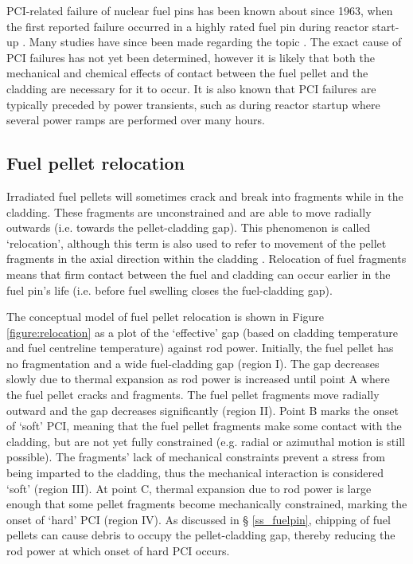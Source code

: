 PCI-related failure of nuclear fuel pins has been known about since 1963, when the first reported failure occurred in a highly rated fuel pin during reactor start-up \cite{lyons1963high}. Many studies have since been made regarding the topic \cite{alam2011review, bcoxpelletclad1990}. The exact cause of PCI failures has not yet been determined, however it is likely that both the mechanical and chemical effects of contact between the fuel pellet and the cladding are necessary for it to occur. It is also known that PCI failures are typically preceded by power transients, such as during reactor startup where several power ramps are performed over many hours.

\subsection{Fuel pellet relocation}

Irradiated fuel pellets will sometimes crack and break into fragments while in the cladding. These fragments are unconstrained and are able to move radially outwards (i.e. towards the pellet-cladding gap). This phenomenon is called `relocation', although this term is also used to refer to movement of the pellet fragments in the axial direction within the cladding \cite{sheppard1982data}. Relocation of fuel fragments means that firm contact between the fuel and cladding can occur earlier in the fuel pin's life (i.e. before fuel swelling closes the fuel-cladding gap).

The conceptual model of fuel pellet relocation is shown in Figure \ref{figure:relocation} as a plot of the `effective' gap (based on cladding temperature and fuel centreline temperature) against rod power. Initially, the fuel pellet has no fragmentation and a wide fuel-cladding gap (region I). The gap decreases slowly due to thermal expansion as rod power is increased until point A where the fuel pellet cracks and fragments. The fuel pellet fragments move radially outward and the gap decreases significantly (region II). Point B marks the onset of `soft' PCI, meaning that the fuel pellet fragments make some contact with the cladding, but are not yet fully constrained (e.g. radial or azimuthal motion is still possible). The fragments' lack of mechanical constraints prevent a stress from being imparted to the cladding, thus the mechanical interaction is considered `soft' (region III). At point C, thermal expansion due to rod power is large enough that some pellet fragments become mechanically constrained, marking the onset of `hard' PCI (region IV). As discussed in § \ref{ss_fuelpin}, chipping of fuel pellets can cause debris to occupy the pellet-cladding gap, thereby reducing the rod power at which onset of hard PCI occurs.

